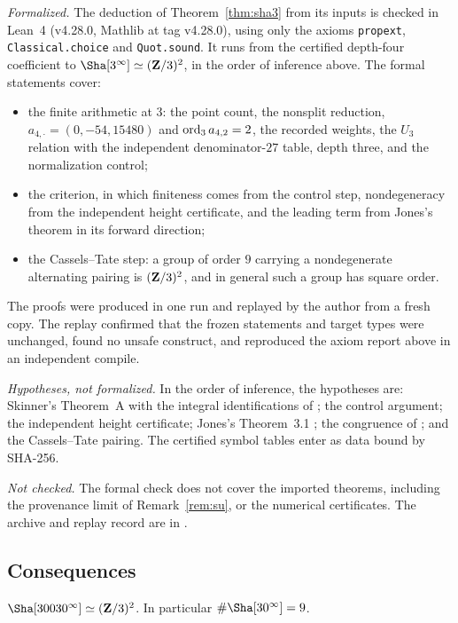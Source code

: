 \begin{remark}\label{rem:a5lean}
\emph{Formalized.} The deduction of Theorem~\ref{thm:sha3} from its inputs is checked in Lean~4 (v4.28.0, Mathlib at tag v4.28.0), using only the axioms \texttt{propext}, \texttt{Classical.choice} and \texttt{Quot.sound}. It runs from the certified depth-four coefficient to $\Sha[3^\infty]\simeq(\Z/3)^2$, in the order of inference above. The formal statements cover:
\begin{itemize}[leftmargin=*]
\item the finite arithmetic at $3$: the point count, the nonsplit reduction, $a_{4,\cdot}=(0,-54,15480)$ and $\operatorname{ord}_3a_{4,2}=2$, the recorded weights, the $U_3$ relation with the independent denominator-$27$ table, depth three, and the normalization control;
\item the criterion, in which finiteness comes from the control step, nondegeneracy from the independent height certificate, and the leading term from Jones's theorem in its forward direction;
\item the Cassels--Tate step: a group of order $9$ carrying a nondegenerate alternating pairing is $(\mathbf{Z}/3)^2$, and in general such a group has square order.
\end{itemize}
The proofs were produced in one run and replayed by the author from a fresh copy. The replay confirmed that the frozen statements and target types were unchanged, found no unsafe construct, and reproduced the axiom report above in an independent compile.

\emph{Hypotheses, not formalized.} In the order of inference, the hypotheses are: Skinner's Theorem~A \cite{skinner} with the integral identifications of \cite{gv}; the control argument; the independent height certificate; Jones's Theorem~3.1 \cite{jones}; the congruence of \cite[Prop.~3.5]{sw}; and the Cassels--Tate pairing. The certified symbol tables enter as data bound by SHA-256.

\emph{Not checked.} The formal check does not cover the imported theorems, including the provenance limit of Remark~\ref{rem:su}, or the numerical certificates. The archive and replay record are in .
\end{remark}

\subsection{Consequences}
\begin{corollary}[\cid{S.P}]\label{cor:small}
$\Sha[30030^\infty]\simeq(\Z/3)^2$. In particular $\#\Sha[30^\infty]=9$.
\end{corollary}

